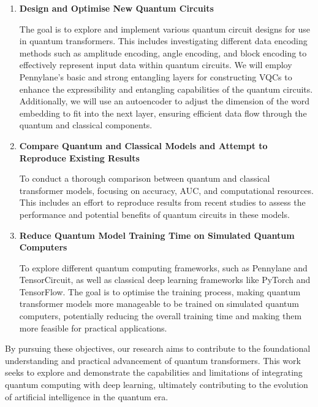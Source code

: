\begin{enumerate}
  \item  \textbf{Design and Optimise New Quantum Circuits}

    The goal is to explore and implement various quantum circuit
    designs for use in quantum transformers. This includes
    investigating different data encoding methods such as amplitude
    encoding, angle encoding, and block encoding to effectively
    represent input data within quantum circuits. We will employ
    Pennylane's basic and strong entangling layers for constructing
    \glspl{VQC} to enhance the expressibility
    and entangling capabilities of the quantum circuits.
    Additionally, we will use an autoencoder to adjust the dimension
    of the word embedding to fit into the next layer, ensuring
    efficient data flow through the quantum and classical components.

  \item  \textbf{Compare Quantum and Classical Models and Attempt to
    Reproduce Existing Results}

    To conduct a thorough comparison between quantum and classical
    transformer models, focusing on accuracy, \gls{AUC}, and computational
    resources. This includes an effort to reproduce results from
    recent studies to assess the performance and potential benefits
    of quantum circuits in these models.

  \item  \textbf{Reduce Quantum Model Training Time on Simulated
    Quantum Computers}

    To explore different quantum computing frameworks, such as
    Pennylane and TensorCircuit, as well as classical deep learning
    frameworks like PyTorch and TensorFlow. The goal is to optimise
    the training process, making quantum transformer models more
    manageable to be trained on simulated quantum computers,
    potentially reducing the overall training time and making them
    more feasible for practical applications.

\end{enumerate}

By pursuing these objectives, our research aims to contribute to the
foundational understanding and practical advancement of quantum
transformers. This work seeks to explore and demonstrate the
capabilities and limitations of integrating quantum computing with
deep learning, ultimately contributing to the evolution of artificial
intelligence in the quantum era.

